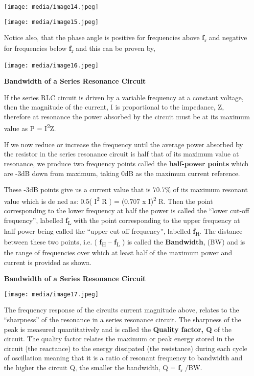 \documentclass[]{article}
\begin{document}
\texttt{[image: media/image14.jpeg]}

\texttt{[image: media/image15.jpeg]}

Notice also, that the phase angle is positive for frequencies above
\textbf{ƒ}\textsubscript{r} and negative for frequencies below
\textbf{ƒ}\textsubscript{r} and this can be proven by,

\texttt{[image: media/image16.jpeg]}

\textbf{Bandwidth of a Series Resonance Circuit}

If the series RLC circuit is driven by a variable frequency at a
constant voltage, then the magnitude of the current, I is proportional
to the impedance, Z, therefore at resonance the power absorbed by the
circuit must be at its maximum value as P = I\textsuperscript{2}Z.

If we now reduce or increase the frequency until the average power
absorbed by the resistor in the series resonance circuit is half that of
its maximum value at resonance, we produce two frequency points called
the \textbf{half-power points} which are -3dB down from maximum, taking
0dB as the maximum current reference.

These -3dB points give us a current value that is 70.7\% of its maximum
resonant value which is de ned as: 0.5( I\textsuperscript{2} R ) =
(0.707 x I)\textsuperscript{2} R. Then the point corresponding to the
lower frequency at half the power is called the ``lower cut-off
frequency'', labelled \textbf{ƒ}\textsubscript{L} with the point
corresponding to the upper frequency at half power being called the
``upper cut-off frequency'', labelled \textbf{ƒ}\textsubscript{H}. The
distance between these two points, i.e. ( \textbf{ƒ}\textsubscript{H} --
\textbf{ƒ}\textsubscript{L} ) is called the \textbf{Bandwidth}, (BW) and
is the range of frequencies over which at least half of the maximum
power and current is provided as shown.

\textbf{Bandwidth of a Series Resonance Circuit}

\texttt{[image: media/image17.jpeg]}

The frequency response of the circuits current magnitude above, relates
to the ``sharpness'' of the resonance in a series resonance circuit. The
sharpness of the peak is measured quantitatively and is called the
\textbf{Quality factor, Q} of the circuit. The quality factor relates
the maximum or peak energy stored in the circuit (the reactance) to the
energy dissipated (the resistance) during each cycle of oscillation
meaning that it is a ratio of resonant frequency to bandwidth and the
higher the circuit Q, the smaller the bandwidth, Q =
\textbf{ƒ}\textsubscript{r} /BW.
\end{document}
